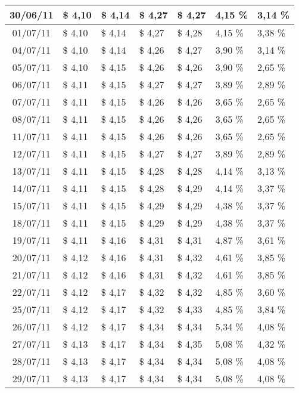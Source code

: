 \begin{center}
\begin{longtable}{|c|p{1.5cm}|p{1.5cm}|p{1.5cm}|p{1.5cm}|p{1.5cm}|p{1.5cm}|}
30/06/11 & \$ 4,10 & \$ 4,14 & \$ 4,27 & \$ 4,27 & 4,15 \% & 3,14 \% \\ \hline
01/07/11 & \$ 4,10 & \$ 4,14 & \$ 4,27 & \$ 4,28 & 4,15 \% & 3,38 \% \\ \hline
04/07/11 & \$ 4,10 & \$ 4,14 & \$ 4,26 & \$ 4,27 & 3,90 \% & 3,14 \% \\ \hline
05/07/11 & \$ 4,10 & \$ 4,15 & \$ 4,26 & \$ 4,26 & 3,90 \% & 2,65 \% \\ \hline
06/07/11 & \$ 4,11 & \$ 4,15 & \$ 4,27 & \$ 4,27 & 3,89 \% & 2,89 \% \\ \hline
07/07/11 & \$ 4,11 & \$ 4,15 & \$ 4,26 & \$ 4,26 & 3,65 \% & 2,65 \% \\ \hline
08/07/11 & \$ 4,11 & \$ 4,15 & \$ 4,26 & \$ 4,26 & 3,65 \% & 2,65 \% \\ \hline
11/07/11 & \$ 4,11 & \$ 4,15 & \$ 4,26 & \$ 4,26 & 3,65 \% & 2,65 \% \\ \hline
12/07/11 & \$ 4,11 & \$ 4,15 & \$ 4,27 & \$ 4,27 & 3,89 \% & 2,89 \% \\ \hline
13/07/11 & \$ 4,11 & \$ 4,15 & \$ 4,28 & \$ 4,28 & 4,14 \% & 3,13 \% \\ \hline
14/07/11 & \$ 4,11 & \$ 4,15 & \$ 4,28 & \$ 4,29 & 4,14 \% & 3,37 \% \\ \hline
15/07/11 & \$ 4,11 & \$ 4,15 & \$ 4,29 & \$ 4,29 & 4,38 \% & 3,37 \% \\ \hline
18/07/11 & \$ 4,11 & \$ 4,15 & \$ 4,29 & \$ 4,29 & 4,38 \% & 3,37 \% \\ \hline
19/07/11 & \$ 4,11 & \$ 4,16 & \$ 4,31 & \$ 4,31 & 4,87 \% & 3,61 \% \\ \hline
20/07/11 & \$ 4,12 & \$ 4,16 & \$ 4,31 & \$ 4,32 & 4,61 \% & 3,85 \% \\ \hline
21/07/11 & \$ 4,12 & \$ 4,16 & \$ 4,31 & \$ 4,32 & 4,61 \% & 3,85 \% \\ \hline
22/07/11 & \$ 4,12 & \$ 4,17 & \$ 4,32 & \$ 4,32 & 4,85 \% & 3,60 \% \\ \hline
25/07/11 & \$ 4,12 & \$ 4,17 & \$ 4,32 & \$ 4,33 & 4,85 \% & 3,84 \% \\ \hline
26/07/11 & \$ 4,12 & \$ 4,17 & \$ 4,34 & \$ 4,34 & 5,34 \% & 4,08 \% \\ \hline
27/07/11 & \$ 4,13 & \$ 4,17 & \$ 4,34 & \$ 4,35 & 5,08 \% & 4,32 \% \\ \hline
28/07/11 & \$ 4,13 & \$ 4,17 & \$ 4,34 & \$ 4,34 & 5,08 \% & 4,08 \% \\ \hline
29/07/11 & \$ 4,13 & \$ 4,17 & \$ 4,34 & \$ 4,34 & 5,08 \% & 4,08 \% \\ \hline

\end{longtable}
\end{center}
